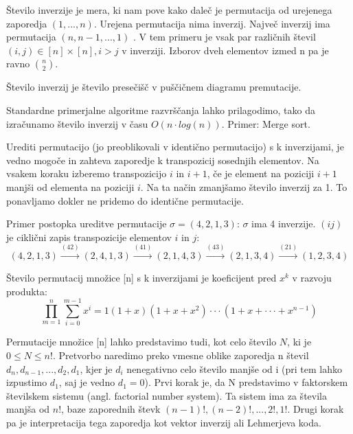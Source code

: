 \documentclass[a4paper, 12pt]{book}
\begin{document}
Število inverzije je mera, ki nam pove kako daleč je permutacija od urejenega zaporedja $(1, ..., n)$. Urejena permutacija nima inverzij. Največ inverzij ima permutacija $(n, n-1, ..., 1)$ . V tem primeru je vsak par različnih števil $(i, j) \in [n] \times [n], i > j$ v inverziji. Izborov dveh elementov izmed n pa je ravno $\binom{n}{2}$.

Število inverzij je število presečišč v puščičnem diagramu premutacije.

Standardne primerjalne algoritme razvrščanja lahko prilagodimo, tako da izračunamo število inverzij v času $O(n \cdot log(n))$. Primer: Merge sort.

Urediti permutacijo (jo preoblikovali v identično permutacijo) s k inverzijami, je vedno mogoče in zahteva zaporedje k transpozicij sosednjih elementov. Na vsakem koraku izberemo transpozicijo $i$ in $i+1$, če je element na poziciji $i+1$ manjši od elementa na poziciji $i$. Na ta način zmanjšamo število inverzij za 1. To ponavljamo dokler ne pridemo do identične permutacije.

Primer postopka ureditve permutacije $\sigma = (4, 2, 1, 3)$: $\sigma$ ima 4 inverzije. $(ij)$ je ciklični zapis transpozicije elementov $i$ in $j$:
\[
    (4, 2, 1, 3) \overset{(42)}{\rightarrow} (2, 4, 1, 3) \overset{(41)}{\rightarrow} (2, 1, 4, 3) \overset{(43)}{\rightarrow} (2, 1, 3, 4) \overset{(21)}{\rightarrow} (1, 2, 3, 4)
\]

Število permutacij množice [n] s k inverzijami je koeficijent pred $x^k$ v razvoju produkta: 
\[\prod_{m=1}^{n}\sum_{i=0}^{m-1} x^i = 1 (1 + x) (1 + x + x^2) \cdot\cdot\cdot (1 + x + \cdot\cdot\cdot + x^{n-1})\]

Permutacije množice [n] lahko predstavimo tudi, kot celo število $N$, ki je $0 \leq N \leq n!$. Pretvorbo naredimo preko vmesne oblike zaporedja n števil $d_n,d_{n-1},...,d_2,d_1$, kjer je $d_i$ nenegativno celo število manjše od i (pri tem lahko izpustimo $d_1$, saj je vedno $d_1 = 0$). Prvi korak je, da N predstavimo v faktorskem številskem sistemu (angl. factorial number system). Ta sistem ima za števila manjša od $n!$, baze zaporednih števk $(n-1)!,(n-2)!,...,2!,1!$. Drugi korak pa je interpretacija tega zaporedja kot vektor inverzij ali Lehmerjeva koda.
\end{document}
